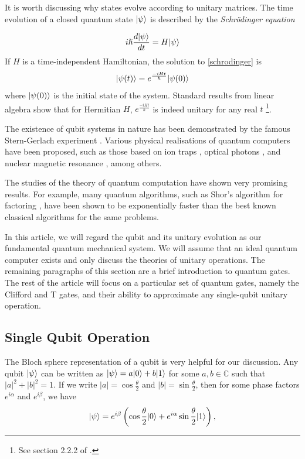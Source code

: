 It is worth discussing why states evolve according to unitary matrices.
The time evolution of a closed quantum state $|\psi\rangle$ is described by the \textit{Schrödinger equation}

\begin{equation}\label{schrodinger}
	i \hslash \frac{d |\psi\rangle}{d t} = H |\psi\rangle
\end{equation}
If $H$ is a time-independent Hamiltonian, the solution to \autoref{schrodinger} is 
$$
|\psi(t)\rangle = e^{\frac{-iH t}{\hslash}} |\psi(0)\rangle
$$
where $|\psi(0)\rangle$ is the initial state of the system.
Standard results from linear algebra show that for Hermitian $H$, $e^{\frac{-i H t}{\hslash}}$ is indeed unitary for any real $t$ \footnote{See section 2.2.2 of \cite{Nielsen_Chuang_2010}.}.

The existence of qubit systems in nature has been demonstrated by the famous Stern-Gerlach experiment \cite{Sakurai_Napolitano_2020}. 
Various physical realisations of quantum computers have been proposed, such as those based on ion traps \cite{steane1997ion}, optical photons \cite{gardiner2004quantum}, and nuclear magnetic resonance \cite{nmr}, among others.

The studies of the theory of quantum computation have shown very promising results. 
For example, many quantum algorithms, such as Shor's algorithm for factoring \cite{Shor_1997}, have been shown to be exponentially faster than the best known classical algorithms for the same problems.

In this article, we will regard the qubit and its unitary evolution as our fundamental quantum mechanical system.
We will assume that an ideal quantum computer exists and only discuss the theories of unitary operations.
The remaining paragraphs of this section are a brief introduction to quantum gates.
The rest of the article will focus on a particular set of quantum gates, namely the Clifford and T gates, and their ability to approximate any single-qubit unitary operation.

\subsection{Single Qubit Operation} \label{sec:bloch-sphere}

The Bloch sphere representation of a qubit is very helpful for our discussion.
Any qubit $|\psi\rangle$ can be written as $|\psi\rangle = a |0\rangle + b |1\rangle$ for some $a , b \in \mathbb{C}$ such that $|a|^2 + |b|^2 = 1$.
If we write $|a| = \cos \frac{\theta}{2}$ and $|b| = \sin \frac{\theta}{2}$, then for some phase factors $e^{i \alpha}$ and $e^{i \beta}$, we have
$$
|\psi\rangle = e^{i \beta} \left(\cos \frac{\theta}{2} |0\rangle + e^{i \alpha} \sin \frac{\theta}{2} |1\rangle\right),
$$

